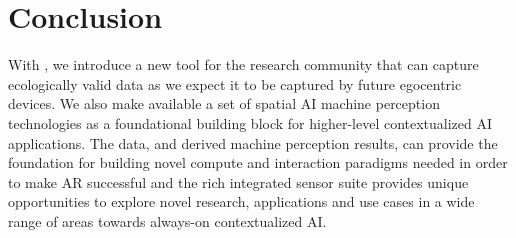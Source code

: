 \section{Conclusion}
\label{sec:conclusion}
With \ProjectAria{}, we introduce a new tool for the research community that can capture ecologically valid data as we expect it to be captured by future egocentric devices. We also make available a set of spatial AI machine perception technologies as a foundational building block for higher-level contextualized AI applications.
The data, and derived machine perception results, can provide the foundation for building novel compute and interaction paradigms needed in order to make AR successful and the rich integrated sensor suite provides unique opportunities to explore novel research, applications and use cases in a wide range of areas towards always-on contextualized AI.
